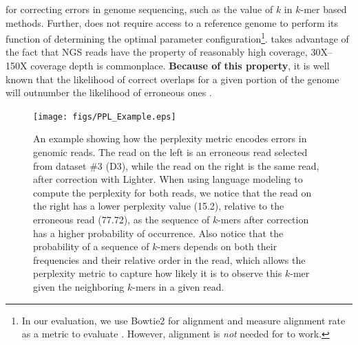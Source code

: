for correcting errors in genome sequencing, such as the value of $k$ in $k$-mer based methods. Further, \name does not require access to a reference genome to perform its function of determining the optimal parameter configuration\footnote{In our evaluation, we use Bowtie2 for alignment and measure alignment rate as a metric to evaluate \name. However, alignment is \textit{not} needed for \name to work.}. 
\name takes advantage of the fact that NGS reads have the property of reasonably high coverage, 30X--150X coverage depth is commonplace. 
\textbf{Because of this property}, it is well known that the likelihood of correct overlaps for a given portion of the genome will outnumber the likelihood of erroneous ones \cite{yang2010reptile}.
\begin{figure}
  \texttt{[image: figs/PPL\_Example.eps]}
  \caption{An example showing how the perplexity metric encodes errors in genomic reads. The read on the left is an erroneous read selected from dataset \#3 (D3), while the read on the right is the same read, after correction with Lighter. When using language modeling to compute the perplexity for both reads, we notice that the read on the right has a lower perplexity value (15.2), relative to the erroneous read (77.72), as the sequence of $k$-mers after correction has a higher probability of occurrence. Also notice that the probability of a sequence of $k$-mers depends on both their frequencies and their relative order in the read, which allows the perplexity metric to capture how likely it is to observe this $k$-mer given the neighboring $k$-mers in a given read.}
  \label{fig:PPL_Simple_Example}
\end{figure}
